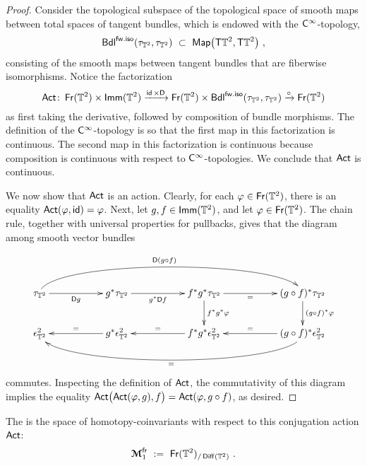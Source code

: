 \begin{proof}
Consider the topological subspace of the topological space of smooth maps between total spaces of tangent bundles, which is endowed with the $\mathsf C^\infty$-topology,
\[
{\sf Bdl}^{\sf fw.iso}(\tau_{\mathbb T^2} , \tau_{\mathbb T^2})
~\subset~
\operatorname{{\sf Map}}\bigl( \mathsf T \mathbb T^2 , \mathsf T \mathbb T^2 \bigr)
~,
\]
consisting of the smooth maps between tangent bundles that are fiberwise isomorphisms.
Notice the factorization
\[
\operatorname{\sf Act}\colon
\operatorname{\sf Fr}(\mathbb T^2)
\times
\operatorname{\sf Imm}(\mathbb T^2)
\xrightarrow{\operatorname{\sf id} \times \mathsf D}
\operatorname{\sf Fr}(\mathbb T^2)
\times 
{\sf Bdl}^{\sf fw.iso}(\tau_{\mathbb T^2} , \tau_{\mathbb T^2})
\xrightarrow{\circ}
\operatorname{\sf Fr}(\mathbb T^2)
\]
as first taking the derivative, followed by composition of bundle morphisms.  
The definition of the $\mathsf C^\infty$-topology is so that the first map in this factorization is continuous. 
The second map in this factorization is continuous because composition is continuous with respect to $\mathsf C^\infty$-topologies.
We conclude that $\operatorname{\sf Act}$ is continuous.  

We now show that $\operatorname{\sf Act}$ is an action.
Clearly, for each $\varphi \in \operatorname{\sf Fr}(\mathbb T^2)$, there is an equality $\operatorname{\sf Act}( \varphi  , \operatorname{\sf id}) = \varphi$.
Next, let $g,f\in \operatorname{\sf Imm}(\mathbb T^2)$, and let $\varphi \in \operatorname{\sf Fr}(\mathbb T^2)$.
The chain rule, together with universal properties for pullbacks, gives that the diagram among smooth vector bundles

\[
\xymatrix{
\tau_{\TT^2}
\ar@(u,u)[rrrrrr]^-{\sD (g\circ f)}
\ar[rr]_-{\sD g}
&&
g^\ast 
\tau_{\TT^2}
\ar[rr]_-{g^\ast \sD f}
&&
f^\ast g^\ast \tau_{\TT^2}
\ar[d]^-{f^\ast g^\ast \varphi}
\ar[rr]_-=
&&
(g\circ f)^\ast \tau_{\TT^2}
\ar[d]^-{(g \circ f)^\ast \varphi}
\\
\epsilon^2_{\TT^2}
&&
g^\ast \epsilon^2_{\TT^2}
\ar[ll]_-=
&&
f^\ast g^\ast \epsilon^2_{\TT^2}
\ar[ll]_-=
&&
(g \circ f)^\ast \epsilon^2_{\TT^2}
\ar[ll]_-=
\ar@(d,d)[llllll]^=
}
\]
commutes. 
Inspecting the definition of $\operatorname{\sf Act}$, the commutativity of this diagram implies the equality $\operatorname{\sf Act}\bigl( \operatorname{\sf Act}(\varphi, g) , f \bigr) = \operatorname{\sf Act}( \varphi , g\circ f)$, as desired.  



\end{proof}




\begin{definition}
\label{r8}
The  is the space of homotopy-coinvariants with respect to this conjugation action $\operatorname{\sf Act}$:
\[
\boldsymbol{\mathcal M}_1^{\operatorname{\sf fr}}
~:=~
\operatorname{\sf Fr}(\mathbb T^2)_{/\operatorname{{\sf Diff}}(\mathbb T^2)}
~.
\]


\end{definition}





